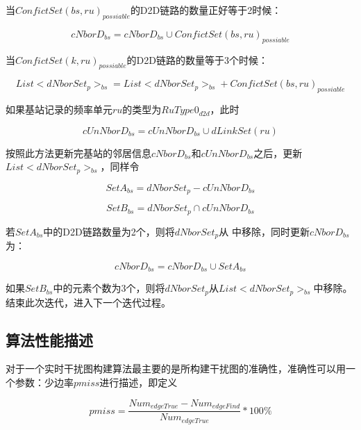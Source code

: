\documentclass[figurelist,tablelist,algorithmlist,nomlist,masters]{seuthesix}
\begin{document}
	
	当$ConfictSet{(bs,ru)_{possiable}}$的D2D链路的数量正好等于2时候：
	
	\begin{equation}\label{eq2.1}
	cNborD_{bs} = cNborD_{bs} \cup ConfictSet{(bs,ru)_{possiable}}
	\end{equation}
	
	当$ConfictSet{(k,ru)_{possiable}}$的D2D链路的数量等于3个时候：
	
	\begin{equation}\label{eq2.1}
	List < dNborSet_{p}{ > _{bs}} = List < dNborSet_{p}{ > _{bs}} + ConfictSet{(bs,ru)_{possiable}}
	\end{equation}
	
	
	如果基站记录的频率单元$ru$的类型为$RuType{0_{d2d}}$，此时
	
	\begin{equation}\label{eq2.1}
	cUnNborD_{bs} = cUnNborD_{bs} \cup dLinkSet(ru)
	\end{equation}
	
	按照此方法更新完基站的邻居信息$cNborD_{bs}$和$cUnNborD_{bs}$之后，更新$List < dNborSet_{p}{ > _{bs}}$，同样令
	
	\begin{equation}\label{eq2.1}
	Set{A_{bs}} = dNborSet_{p} - cUnNborD_{bs}
	\end{equation}
	
	\begin{equation}\label{eq2.1}
	Set{B_{bs}} = dNborSet_{p} \cap cUnNborD_{bs}
	\end{equation}
	
	若$Set{A_{bs}}$中的D2D链路数量为2个，则将$dNborSet_{p}$从 中移除，同时更新$cNborD_{bs}$为：
	
	\begin{equation}\label{eq2.1}
	cNborD_{bs} = cNborD_{bs} \cup Set{A_{bs}}
	\end{equation}
	
	如果$Set{B_{bs}}$中的元素个数为3个，则将$dNborSet_{p}$从$List < dNborSet_{p}{ > _{bs}}$中移除。 
	结束此次迭代，进入下一个迭代过程。
	

	\subsection{算法性能描述}
	对于一个实时干扰图构建算法最主要的是所构建干扰图的准确性，准确性可以用一个参数：少边率$pmiss$进行描述，即定义
	
	\begin{equation}\label{eq2.1}
		{pmiss} = \frac{{Nu{m_{edgeTrue}} - Nu{m_{edgeFind}}}}{{Nu{m_{edgeTrue}}}}*100\% 
	\end{equation}
	
\end{document}
